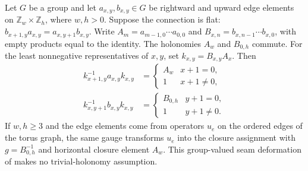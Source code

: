 \begin{lemma}%
    \label{thm:peps_torus_flat_connection_gauge}
    \leanok
    Let $G$ be a group and let $a_{x,y},b_{x,y}\in G$ be rightward
    and upward edge elements on $\mathbb Z_w\times\mathbb Z_h$, where
    $w,h>0$. Suppose the connection is flat:
    $b_{x+1,y}a_{x,y}=a_{x,y+1}b_{x,y}$.
    Write $A_m=a_{m-1,0}\cdots a_{0,0}$ and
    $B_{x,n}=b_{x,n-1}\cdots b_{x,0}$, with empty products equal to
    the identity. The holonomies $A_w$ and $B_{0,h}$ commute.
    For the least nonnegative representatives of $x,y$, set
    $k_{x,y}=B_{x,y}A_x$. Then
    \begin{align}
        k_{x+1,y}^{-1}a_{x,y}k_{x,y}
         & =\begin{cases}A_w&x+1=0,\\1&x+1\ne0,\end{cases}
        \label{eq:peps_flat_horizontal_seam}                   \\
        k_{x,y+1}^{-1}b_{x,y}k_{x,y}
         & =\begin{cases}B_{0,h}&y+1=0,\\1&y+1\ne0.\end{cases}
        \label{eq:peps_flat_vertical_seam}
    \end{align}
    If $w,h\ge3$ and the edge elements come from operators $u_e$ on
    the ordered edges of the torus graph, the same gauge transforms
    $u_e$ into the closure assignment with $g=B_{0,h}^{-1}$ and
    horizontal closure element $A_w$. This group-valued seam deformation
    of \cite[Section~5]{Schuch2010PEPS} makes no trivial-holonomy
    assumption.
\end{lemma}

